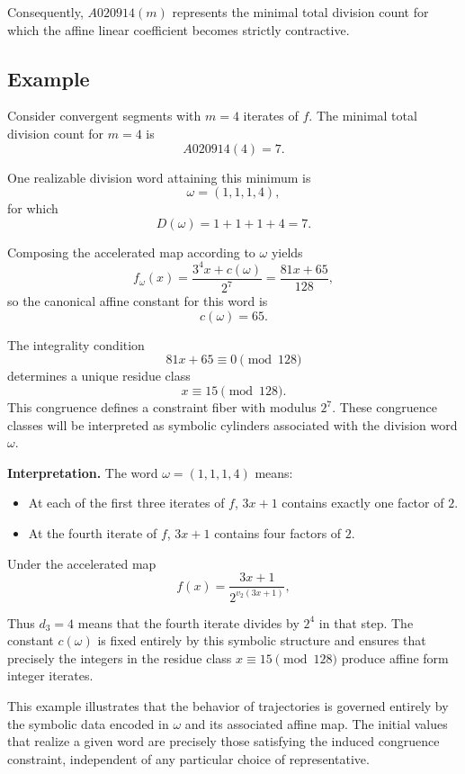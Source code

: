 \documentclass[12pt, oneside]{article}
\numberwithin{equation}{section}
\theoremstyle{definition}
\theoremstyle{plain}
\theoremstyle{remark}
\begin{document}
Consequently, \(A020914(m)\) represents the minimal total division count
for which the affine linear coefficient becomes strictly contractive.

\subsection{Example}

Consider convergent segments with $m=4$ iterates of $f$.  
The minimal total division count for $m=4$ is
\[
A020914(4) = 7.
\]

One realizable division word attaining this minimum is
\[
\omega = (1,1,1,4),
\]
for which
\[
D(\omega) = 1+1+1+4 = 7.
\]

Composing the accelerated map according to $\omega$ yields
\[
f_\omega(x)=\frac{3^4 x + c(\omega)}{2^7}
           = \frac{81x + 65}{128},
\]
so the canonical affine constant for this word is
\[
c(\omega)=65.
\]

The integrality condition
\[
81x + 65 \equiv 0 \pmod{128}
\]
determines a unique residue class
\[
x \equiv 15 \pmod{128}.
\]
This congruence defines a constraint fiber with modulus $2^7$.
These congruence classes will be interpreted as symbolic cylinders
associated with the division word \(\omega\).

\medskip

\noindent
\textbf{Interpretation.}
The word $\omega = (1,1,1,4)$ means:

\begin{itemize}
    \item At each of the first three iterates of $f$, $3x+1$ contains exactly one factor of $2$.
    \item At the fourth iterate of $f$, $3x+1$ contains four factors of $2$.
\end{itemize}

Under the accelerated map
\[
f(x)=\frac{3x+1}{2^{v_2(3x+1)}},
\]

Thus $d_3=4$ means that the fourth iterate divides by $2^4$ in that step.
The constant $c(\omega)$ is fixed entirely by this symbolic structure and
ensures that precisely the integers in the residue class $x \equiv 15 \pmod{128}$
produce affine form integer iterates.

This example illustrates that the behavior of trajectories is governed
entirely by the symbolic data encoded in $\omega$ and its associated
affine map. The initial values that realize a given word are precisely
those satisfying the induced congruence constraint, independent of any
particular choice of representative.
\end{document}

